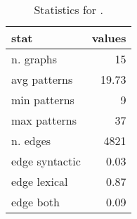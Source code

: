 \begin{table}[t]
    \centering
\begin{tabular}{lr}
\toprule
           stat &   values \\
\midrule
      n. graphs &    15 \\
   avg patterns &    19.73 \\
   min patterns &     9 \\
   max patterns &    37 \\
       n. edges &  4821 \\
 edge syntactic &     0.03 \\
   edge lexical &     0.87 \\
      edge both &     0.09 \\
\bottomrule
\end{tabular}
    \caption{Statistics for \resource{}. }
    \label{tab:rel-graph-stats}
\end{table}